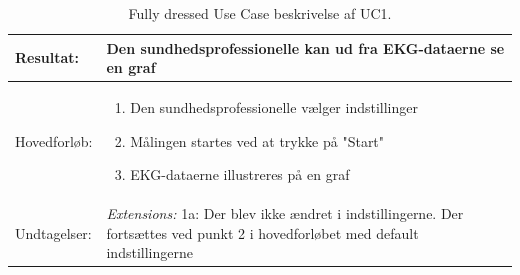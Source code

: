 \begin{table}[H]
\begin{tabularx}{\textwidth}{l X}
     Resultat:              & 	Den sundhedsprofessionelle kan ud fra EKG-dataerne se en graf                                                                                                                                                                                                                                                                                                                                                                                                                                                                                                                                                   \\ \midrule \addlinespace[1mm]                                                                                                                                                       
     Hovedforløb:           &  \begin{enumerate}
     						   \item Den sundhedsprofessionelle vælger indstillinger
\newline						[Extension 1a: Den sundhedsprofessionelle er tilfreds med default-indstillingerne]
     						   \item Målingen startes ved at trykke på "Start"
		   				   	   \item EKG-dataerne illustreres på en graf
     						   \end{enumerate}
\\ \midrule 
 	Undtagelser:           & \textit{Extensions:}
\newline					 1a: Der blev ikke ændret i indstillingerne. Der fortsættes ved punkt 2 i hovedforløbet med default indstillingerne 
\\ \bottomrule
    \end{tabularx}
    \caption {Fully dressed Use Case beskrivelse af UC1.}
    \label{tab:UC1}
\end{table}




